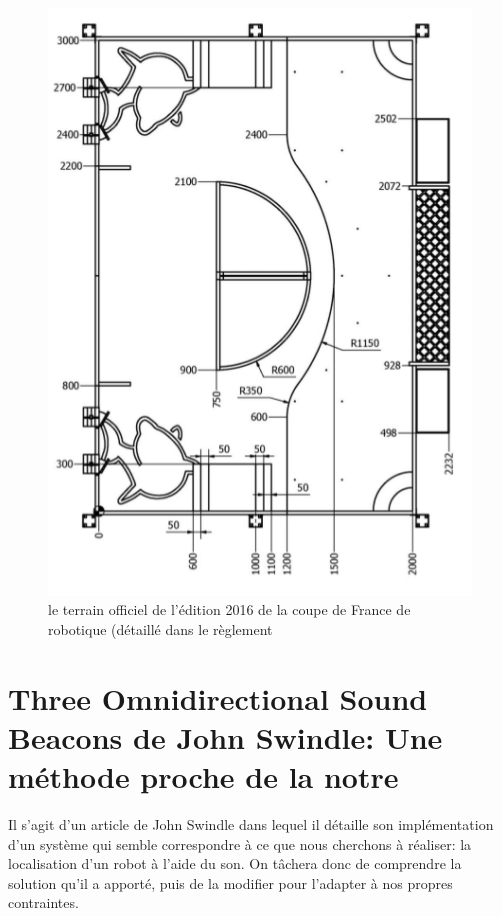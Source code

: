 \documentclass[12pt,a4paper]{report}
\begin{document}
\begin{figure}[H]
\includegraphics[width=13cm]{resources/img/terrain_officiel.png} 
\caption{le terrain officiel de l'édition 2016 de la coupe de France de robotique (détaillé dans le règlement\cite{reglement_cdf}}
\end{figure}

\chapter{Three Omnidirectional Sound Beacons de John Swindle: Une méthode proche de la notre}
Il s'agit d'un article de John Swindle\cite{john_swindle2010} dans lequel il détaille son implémentation d'un système qui semble correspondre à ce que nous cherchons à réaliser: la localisation d'un robot à l'aide du son. On tâchera donc de comprendre la solution qu'il a apporté, puis de la modifier pour l'adapter à nos propres contraintes.
\end{document}
